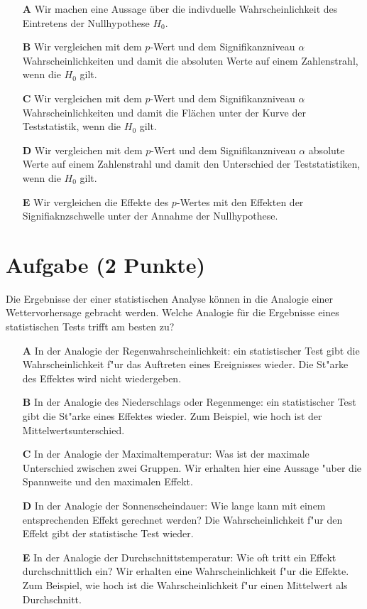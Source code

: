 \documentclass[a4paper, 9pt]{scrartcl}\usepackage[]{graphicx}\usepackage[]{xcolor}
\begin{document}
\begin{enumerate}
\item [\textbf{A} \msquare] Wir machen eine Aussage über die indivduelle Wahrscheinlichkeit des Eintretens der Nullhypothese $H_0$.
\item [\textbf{B} \msquare] Wir vergleichen mit dem $p$-Wert und dem Signifikanzniveau $\alpha$ Wahrscheinlichkeiten und damit die absoluten Werte auf einem Zahlenstrahl, wenn die $H_0$ gilt.
\item [\textbf{C} \msquare] Wir vergleichen mit dem $p$-Wert und dem Signifikanzniveau $\alpha$ Wahrscheinlichkeiten und damit die Flächen unter der Kurve der Teststatistik, wenn die $H_0$ gilt.
\item [\textbf{D} \msquare] Wir vergleichen mit dem $p$-Wert und dem Signifikanzniveau $\alpha$ absolute Werte auf einem Zahlenstrahl und damit den Unterschied der Teststatistiken, wenn die $H_0$ gilt.
\item [\textbf{E} \msquare] Wir vergleichen die Effekte des $p$-Wertes mit den Effekten der Signifiaknzschwelle unter der Annahme der Nullhypothese.
\end{enumerate}

\section{Aufgabe \hfill (2 Punkte)}



Die Ergebnisse der einer statistischen Analyse k{\"o}nnen in die Analogie einer
Wettervorhersage gebracht werden. Welche Analogie f{\"u}r die
Ergebnisse eines statistischen Tests trifft am besten zu?



\begin{enumerate}
\item [\textbf{A} \msquare] In der Analogie der Regenwahrscheinlichkeit: ein statistischer Test gibt die Wahrscheinlichkeit f{"u}r das Auftreten eines Ereignisses wieder. Die St{"a}rke des Effektes wird nicht wiedergeben.
\item [\textbf{B} \msquare] In der Analogie des Niederschlags oder Regenmenge: ein statistischer Test gibt die St{"a}rke eines Effektes wieder. Zum Beispiel, wie hoch ist der Mittelwertsunterschied.
\item [\textbf{C} \msquare] In der Analogie der Maximaltemperatur: Was ist der maximale Unterschied zwischen zwei Gruppen. Wir erhalten hier eine Aussage {"u}ber die Spannweite und den maximalen Effekt.
\item [\textbf{D} \msquare] In der Analogie der Sonnenscheindauer: Wie lange kann mit einem entsprechenden Effekt gerechnet werden? Die Wahrscheinlichkeit f{"u}r den Effekt gibt der statistische Test wieder.
\item [\textbf{E} \msquare] In der Analogie der Durchschnittstemperatur: Wie oft tritt ein Effekt durchschnittlich ein? Wir erhalten eine Wahrscheinlichkeit f{"u}r die Effekte. Zum Beispiel, wie hoch ist die Wahrscheinlichkeit f{"u}r einen Mittelwert als Durchschnitt.
\end{enumerate}
\end{document}
